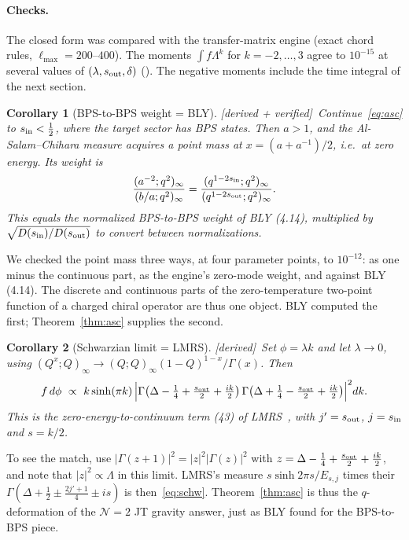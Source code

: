 \documentclass[11pt]{article}
\newcommand{\sI}{s_{\rm in}}
\newcommand{\sout}{s_{\rm out}}
\newcommand{\poch}[2]{(#1;#2)_\infty}
\newcommand{\tagbox}[2]{\textsf{\small\color{#1}[#2]}}
\newcommand{\DER}{\tagbox{cder}{derived}}
\newcommand{\VER}{\tagbox{cder}{derived + verified}}
\theoremstyle{plain}
\newtheorem{corollary}{Corollary}
\theoremstyle{remark}
\numberwithin{equation}{section}
\begin{document}
\paragraph{Checks.} The closed form was compared with the transfer-matrix engine (exact chord rules, $\ell_{\max}=200$--$400$).
The moments $\int f\Lambda^k$ for $k=-2,\dots,3$ agree to $10^{-15}$ at several values of $(\lambda,\sout,\delta)$
(). The negative moments include the time integral of the next section.

\begin{corollary}[BPS-to-BPS weight = BLY]\label{cor:bly}\VER\
Continue~\eqref{eq:asc} to $\sI<\tfrac12$, where the target sector has BPS states. Then $a>1$, and the
Al-Salam--Chihara measure acquires a point mass at $x=(a+a^{-1})/2$, i.e.\ at zero energy. Its weight is
\[
\frac{\poch{a^{-2}}{q^2}}{\poch{b/a}{q^2}}=\frac{\poch{q^{1-2\sI}}{q^2}}{\poch{q^{1-2\sout}}{q^2}} .
\]
This equals the normalized BPS-to-BPS weight of BLY (4.14), multiplied by $\sqrt{D(\sI)/D(\sout)}$ to convert between
normalizations.
\end{corollary}
We checked the point mass three ways, at four parameter points, to $10^{-12}$: as one minus the continuous part, as the
engine's zero-mode weight, and against BLY (4.14). The discrete and continuous parts of the zero-temperature two-point
function of a charged chiral operator are thus one object. BLY computed the first; Theorem~\ref{thm:asc} supplies the
second.

\begin{corollary}[Schwarzian limit = LMRS]\label{cor:lmrs}\DER\
Set $\phi=\lambda k$ and let $\lambda\to0$, using $\poch{Q^{x}}{Q}\to\poch{Q}{Q}(1-Q)^{1-x}/\Gamma(x)$. Then
\begin{equation}\label{eq:schw}
f\,d\phi\ \propto\ k\sinh(\pi k)\,\Big|\Gamma\big(\Delta-\tfrac14+\tfrac{\sout}{2}+\tfrac{ik}{2}\big)\,
\Gamma\big(\Delta+\tfrac14-\tfrac{\sout}{2}+\tfrac{ik}{2}\big)\Big|^2dk .
\end{equation}
This is the zero-energy-to-continuum term (43) of LMRS~\cite{LMRS}, with $j'=\sout$, $j=\sI$ and $s=k/2$.
\end{corollary}
To see the match, use $|\Gamma(z+1)|^2=|z|^2|\Gamma(z)|^2$ with $z=\Delta-\frac14+\frac{\sout}2+\frac{ik}2$, and note
that $|z|^2\propto\Lambda$ in this limit. LMRS's measure $s\sinh 2\pi s/E_{s,j}$ times their
$\Gamma(\Delta+\frac12\pm\frac{2j'+1}4\pm is)$ is then~\eqref{eq:schw}. Theorem~\ref{thm:asc} is thus the
$q$-deformation of the $\mathcal N=2$ JT gravity answer, just as BLY found for the BPS-to-BPS piece.
\end{document}
